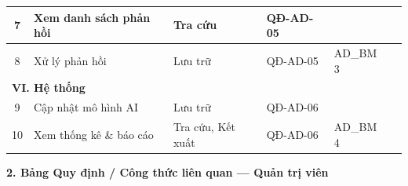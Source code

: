 \documentclass[12pt,a4paper]{article}
\begin{document}
\begin{longtable}{|c|l|l|l|l|p{3.5cm}|}
    \hline
    7            & Xem danh sách phản hồi      & Tra cứu                 & QĐ-AD-05                       &                             &                  \\
    \hline
    8            & Xử lý phản hồi              & Lưu trữ                 & QĐ-AD-05                       & AD\_BM 3                    &                  \\
    \hline
    \multicolumn{6}{|l|}{\cellcolor{notegreen}\textbf{VI. Hệ thống}}                                                                                       \\
    \hline
    9            & Cập nhật mô hình AI         & Lưu trữ                 & QĐ-AD-06                       &                             &                  \\
    \hline
    10           & Xem thống kê \& báo cáo     & Tra cứu, Kết xuất       & QĐ-AD-06                       & AD\_BM 4                    &                  \\
    \hline
\end{longtable}

\vspace{0.3cm}
\textbf{2. Bảng Quy định / Công thức liên quan --- Quản trị viên}
\end{document}
